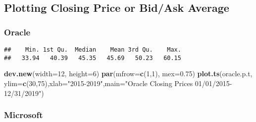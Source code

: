 \documentclass[]{article}
\newenvironment{Shaded}{\begin{snugshade}}{\end{snugshade}}
\newcommand{\KeywordTok}[1]{\textcolor[rgb]{0.13,0.29,0.53}{\textbf{#1}}}
\newcommand{\DataTypeTok}[1]{\textcolor[rgb]{0.13,0.29,0.53}{#1}}
\newcommand{\DecValTok}[1]{\textcolor[rgb]{0.00,0.00,0.81}{#1}}
\newcommand{\FloatTok}[1]{\textcolor[rgb]{0.00,0.00,0.81}{#1}}
\newcommand{\StringTok}[1]{\textcolor[rgb]{0.31,0.60,0.02}{#1}}
\newcommand{\CommentTok}[1]{\textcolor[rgb]{0.56,0.35,0.01}{\textit{#1}}}
\newcommand{\OperatorTok}[1]{\textcolor[rgb]{0.81,0.36,0.00}{\textbf{#1}}}
\newcommand{\NormalTok}[1]{#1}
\begin{document}
\subsection{Plotting Closing Price or Bid/Ask
Average}\label{plotting-closing-price-or-bidask-average}

\subsubsection{Oracle}\label{oracle}

\begin{Shaded}
\end{Shaded}

\begin{verbatim}
##    Min. 1st Qu.  Median    Mean 3rd Qu.    Max. 
##   33.94   40.39   45.35   45.69   50.23   60.15
\end{verbatim}

\begin{Shaded}
\begin{Highlighting}[]
\KeywordTok{dev.new}\NormalTok{(}\DataTypeTok{width=}\DecValTok{12}\NormalTok{, }\DataTypeTok{height=}\DecValTok{6}\NormalTok{)}
\KeywordTok{par}\NormalTok{(}\DataTypeTok{mfrow=}\KeywordTok{c}\NormalTok{(}\DecValTok{1}\NormalTok{,}\DecValTok{1}\NormalTok{), }\DataTypeTok{mex=}\FloatTok{0.75}\NormalTok{)}
\KeywordTok{plot.ts}\NormalTok{(oracle.p.t, }\DataTypeTok{ylim=}\KeywordTok{c}\NormalTok{(}\DecValTok{30}\NormalTok{,}\DecValTok{75}\NormalTok{),}\DataTypeTok{xlab=}\StringTok{"2015-2019"}\NormalTok{,}\DataTypeTok{main=}\StringTok{"Oracle Closing Prices 01/01/2015-12/31/2019"}\NormalTok{)}
\end{Highlighting}
\end{Shaded}

\subsubsection{Microsoft}\label{microsoft}

\begin{Shaded}
\end{Shaded}
\end{document}
